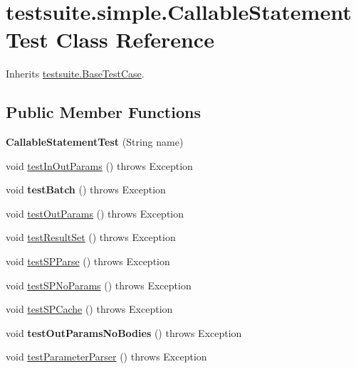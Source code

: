 \hypertarget{classtestsuite_1_1simple_1_1_callable_statement_test}{}\section{testsuite.\+simple.\+Callable\+Statement\+Test Class Reference}
\label{classtestsuite_1_1simple_1_1_callable_statement_test}


Inherits \mbox{\hyperlink{classtestsuite_1_1_base_test_case}{testsuite.\+Base\+Test\+Case}}.

\subsection*{Public Member Functions}
\begin{DoxyCompactItemize}
\item 
\mbox{\label{classtestsuite_1_1simple_1_1_callable_statement_test_aea47c080476cb1ba38504913a365d668}} 
{\bfseries Callable\+Statement\+Test} (String name)
\item 
void \mbox{\hyperlink{classtestsuite_1_1simple_1_1_callable_statement_test_aff9447e7125f78c20b0eab4c5646b013}{test\+In\+Out\+Params}} ()  throws Exception 
\item 
\mbox{\label{classtestsuite_1_1simple_1_1_callable_statement_test_ab56a0db2ddecf45b3dbcf0505a0e29dd}} 
void {\bfseries test\+Batch} ()  throws Exception 
\item 
void \mbox{\hyperlink{classtestsuite_1_1simple_1_1_callable_statement_test_a1b410c096cba5e99995e4e3fb465a1b7}{test\+Out\+Params}} ()  throws Exception 
\item 
void \mbox{\hyperlink{classtestsuite_1_1simple_1_1_callable_statement_test_a8007b7089823f54d85bc02cf1c5427e8}{test\+Result\+Set}} ()  throws Exception 
\item 
void \mbox{\hyperlink{classtestsuite_1_1simple_1_1_callable_statement_test_ad2d1ffaddb39bf287b37661e592ef2f6}{test\+S\+P\+Parse}} ()  throws Exception 
\item 
void \mbox{\hyperlink{classtestsuite_1_1simple_1_1_callable_statement_test_a5382df497dce2b6ecd935d4550a5b505}{test\+S\+P\+No\+Params}} ()  throws Exception 
\item 
void \mbox{\hyperlink{classtestsuite_1_1simple_1_1_callable_statement_test_ac41eeda6e62222c52818858c877b29f3}{test\+S\+P\+Cache}} ()  throws Exception 
\item 
\mbox{\label{classtestsuite_1_1simple_1_1_callable_statement_test_a179baddfa438453902f8136cb9cd1041}} 
void {\bfseries test\+Out\+Params\+No\+Bodies} ()  throws Exception 
\item 
void \mbox{\hyperlink{classtestsuite_1_1simple_1_1_callable_statement_test_a0586bd82e4c828405b924bb8262f464c}{test\+Parameter\+Parser}} ()  throws Exception 
\end{DoxyCompactItemize}
